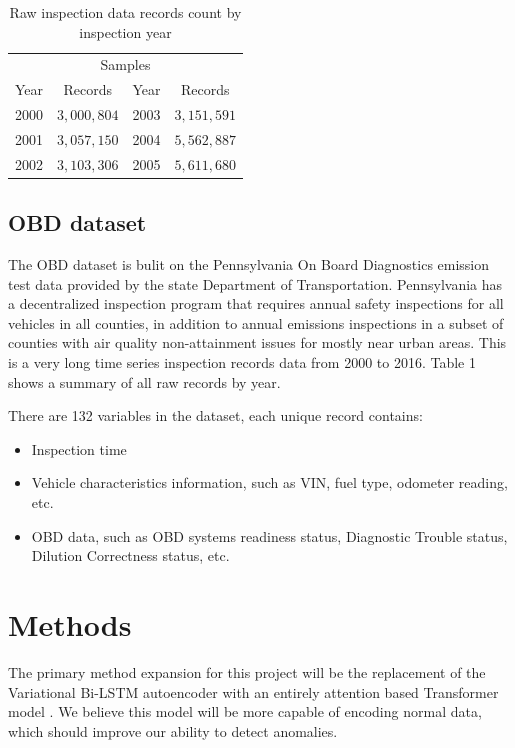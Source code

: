 \documentclass{article}
\begin{document}
\begin{table}
  \caption{Raw inspection data records count by inspection year}
  \label{obd data}
  \centering
  \begin{tabular}{cccc}
    \toprule
    \multicolumn{4}{c}{Samples}                   \\
    \cmidrule(r){1-4}
    Year & Records & Year & Records      \\
    \midrule
    2000 & $3,000,804$ & 2003 & $3,151,591$     \\
    2001 & $3,057,150$ & 2004 & $5,562,887$       \\
    2002 & $3,103,306$ & 2005 & $5,611,680$      \\
    \bottomrule
  \end{tabular}
\end{table}

\subsection{OBD dataset}
The OBD dataset is bulit on the Pennsylvania On Board Diagnostics emission test data provided by the state Department of Transportation. Pennsylvania has a decentralized inspection program that requires annual safety inspections for all vehicles in all counties, in addition to annual emissions inspections in a subset of counties with air quality non-attainment issues for mostly near urban areas. This is a very long time series inspection records data from 2000 to 2016. Table 1 shows a summary of all raw records by year.

There are 132 variables in the dataset, each unique record contains:
\begin{itemize}

\item Inspection time
    
\item Vehicle characteristics information, such as VIN, fuel type, odometer reading, etc.

\item OBD data, such as OBD systems readiness status, Diagnostic Trouble status, Dilution Correctness status, etc.

\end{itemize}


\section{Methods}
The primary method expansion for this project will be the replacement of the Variational Bi-LSTM autoencoder with an entirely attention based Transformer model \cite{NIPS2017_7181}. We believe this model will be more capable of encoding normal data, which should improve our ability to detect anomalies.


{


}
\end{document}
